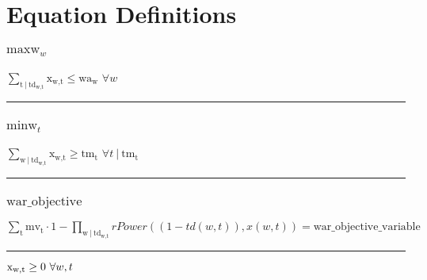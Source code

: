\documentclass[11pt]{article}
\begin{document}
\section*{Equation Definitions}
\subsubsection*{\begin{math}\text{maxw}_{w}\end{math}}
\begin{math}
\displaystyle \sum_{\text{t} ~ | ~ \text{td}_{\text{w},\text{t}}} \text{x}_{\text{w},\text{t}} \leq \text{wa}_{\text{w}}
\end{math}
\hfill
\begin{math}
\forall w
\end{math}\vspace{5pt}
\hrule
\subsubsection*{\begin{math}\text{minw}_{t}\end{math}}
\begin{math}
\displaystyle \sum_{\text{w} ~ | ~ \text{td}_{\text{w},\text{t}}} \text{x}_{\text{w},\text{t}} \geq \text{tm}_{\text{t}}
\end{math}
\hfill
\begin{math}
\forall t ~ | ~ \text{tm}_{\text{t}} 
\end{math}\vspace{5pt}
\hrule
\subsubsection*{\begin{math}\text{war\_objective}\end{math}}
\begin{math}
\displaystyle \sum_{\text{t}} \text{mv}_{\text{t}} \cdot 1 - \displaystyle \prod_{\text{w} ~ | ~ \text{td}_{\text{w},\text{t}}}  rPower((1 - td(w,t)),x(w,t))  = \text{war\_objective\_variable}
\end{math}
\vspace{5pt}
\hrule
\bigskip
\begin{math}\text{x}_{\text{w},\text{t}}\geq 0 ~ \forall w,t\\\end{math}
\end{document}
